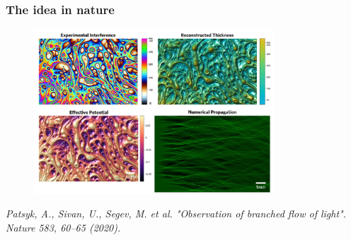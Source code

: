 \frametitle{The idea in nature}

\begin{figure}[h]
    \centering
    \includegraphics[width=0.8\textwidth]{images/nature_article.png}
\end{figure}
\textit{Patsyk, A., Sivan, U., Segev, M. et al. "Observation of branched flow of light". Nature 583, 60–65 (2020).}
